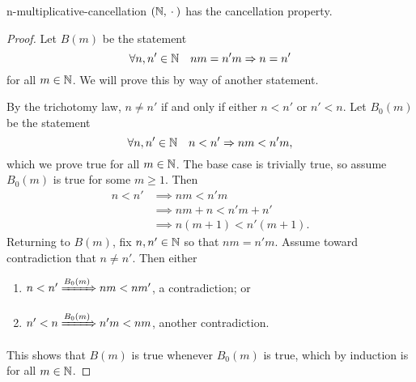 \documentclass[master.tex]{subfiles}
\begin{document}
    \begin{lemma}{}{n-multiplicative-cancellation}
        $(\mathbb{N}, {}\cdot{}{})$ has the cancellation property.
        \hr{}
        \begin{proof}
            Let $B(m)$ be the statement
            \[
                \forall n, n' \in \mathbb{N} \quad nm = n'm \Rightarrow n = n'  
            \]
            for all $m \in \mathbb{N}$.
            We will prove this by way of another statement.

            By the trichotomy law, $n \neq n'$ if and only if either $n < n'$ or $n' < n$.
            Let $B_0(m)$ be the statement
            \[
                  \forall n, n' \in \mathbb{N} \quad n < n' \Rightarrow nm < n'm
            ,\]
            which we prove true for all $m \in \mathbb{N}$.
            The base case is trivially true, so assume $B_0(m)$ is true for some $m \geq 1$.
            Then
            \begin{align*}
                n < n' &\implies nm < n'm \\
                &\implies nm + n < n'm + n' \\
                &\implies n(m + 1) < n'(m + 1).
            \end{align*}
            Returning to $B(m)$, fix $n, n' \in \mathbb{N}$ so that $nm = n'm$.
            Assume toward contradiction that $n \neq n'$.
            Then either
            \begin{enumerate}
                \item $n < n' \xRightarrow{B_0(m)} nm < nm'$, a contradiction; or
                \item $n' < n \xRightarrow{B_0(m)} n'm < nm$, another contradiction.
            \end{enumerate}
            This shows that $B(m)$ is true whenever $B_0(m)$ is true, which by induction is for all $m \in \mathbb{N}$.
        \end{proof}
    \end{lemma}
\end{document}
